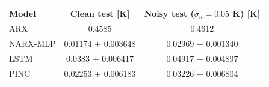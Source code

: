 \begin{tabular}{lcc}
\toprule
Model & Clean test [K] & Noisy test ($\sigma_n = 0.05$ K) [K] \\
\midrule
ARX & 0.4585 & 0.4612 \\
NARX-MLP & 0.01174 $\pm$ 0.003648 & 0.02969 $\pm$ 0.001340 \\
LSTM & 0.0383 $\pm$ 0.006417 & 0.04917 $\pm$ 0.004897 \\
PINC & 0.02253 $\pm$ 0.006183 & 0.03226 $\pm$ 0.006804 \\
\bottomrule
\end{tabular}
